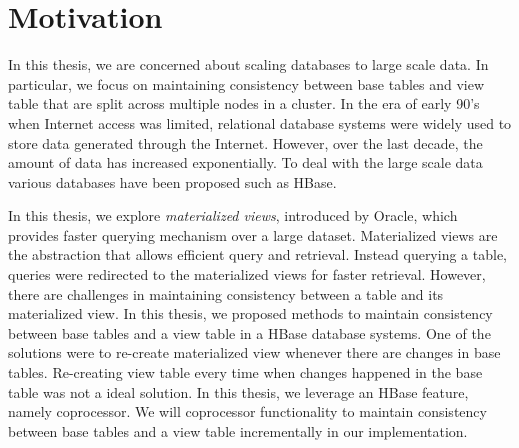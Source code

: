 \documentclass[11pt,a4paper,bibtotoc,idxtotoc,headsepline,footsepline,footexclude,BCOR12mm,DIV13]{scrbook}
\begin{document}

\section{Motivation}
\label{Motivation}


In this thesis, we are concerned about scaling databases to large scale data. In particular, we focus on maintaining consistency between base tables and view table that are split across multiple nodes in a cluster. In the era of early 90's when Internet access was limited, relational database systems were widely used to store data generated through the Internet. However, over the last decade, the amount of data has increased exponentially. To deal with the large scale data various databases have been proposed such as HBase.

In this thesis, we explore \emph{materialized views}, introduced by Oracle, which provides faster querying mechanism over a large dataset. Materialized views  are the abstraction that allows efficient 
query and retrieval. Instead querying a table, queries were redirected to the materialized views for faster retrieval. However, there are challenges in maintaining consistency between a table and its materialized view. In this thesis, we proposed methods to maintain consistency between base tables and a view table in a HBase database systems. One of the solutions were to re-create materialized view whenever there are changes in base tables. Re-creating view table every  time when changes happened in the base table was not a ideal solution. In this thesis, we leverage an HBase feature, namely coprocessor. We will coprocessor functionality to maintain consistency between base tables and a view table incrementally in our implementation.
\end{document}
